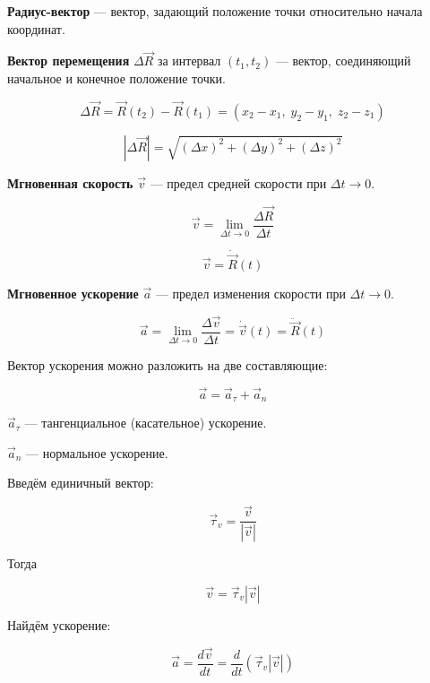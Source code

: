 \documentclass[a4paper,12pt]{article}
\begin{document}
\begin{definitionbox}
\textbf{Радиус-вектор} — вектор, задающий положение точки относительно начала координат.
\end{definitionbox}

\begin{definitionbox}
\textbf{Вектор перемещения} $\Delta \vec R$ за интервал $(t_1, t_2)$ — вектор, соединяющий начальное и конечное положение точки.
\end{definitionbox}

\[
\Delta \vec R
=
\vec R(t_2)
-
\vec R(t_1)
=
(x_2-x_1,\; y_2-y_1,\; z_2-z_1)
\]

\[
|\Delta \vec R|
=
\sqrt{(\Delta x)^2 + (\Delta y)^2 + (\Delta z)^2}
\]

\begin{definitionbox}
\textbf{Мгновенная скорость} $\vec v$ — предел средней скорости при $\Delta t \to 0$.
\end{definitionbox}

\[
\vec v
=
\lim_{\Delta t \to 0}
\frac{\Delta \vec R}{\Delta t}
\]

\[
\vec v
=
\dot{\vec R}(t)
\]

\begin{definitionbox}
\textbf{Мгновенное ускорение} $\vec a$ — предел изменения скорости при $\Delta t \to 0$.
\end{definitionbox}

\[
\vec a
=
\lim_{\Delta t \to 0}
\frac{\Delta \vec v}{\Delta t}
=
\dot{\vec v}(t)
=
\ddot{\vec R}(t)
\]

Вектор ускорения можно разложить на две составляющие:

\[
\vec a
=
\vec a_{\tau}
+
\vec a_n
\]

\begin{definitionbox}
$\vec a_{\tau}$ — тангенциальное (касательное) ускорение.
\end{definitionbox}

\begin{definitionbox}
$\vec a_n$ — нормальное ускорение.
\end{definitionbox}

Введём единичный вектор:

\[
\vec \tau_v
=
\frac{\vec v}{|\vec v|}
\]

Тогда

\[
\vec v
=
\vec \tau_v |\vec v|
\]

Найдём ускорение:

\[
\vec a
=
\frac{d\vec v}{dt}
=
\frac{d}{dt}\left(\vec \tau_v |\vec v|\right)
\]
\end{document}

